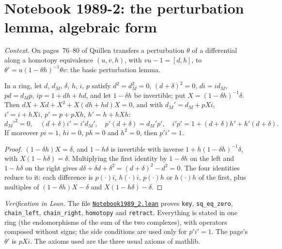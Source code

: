 \section[Notebook 1989-2: the perturbation lemma]{Notebook 1989-2: the perturbation lemma, algebraic form\protect{}}\label{sec:quillen-1989-2}

\emph{Context.} On pages~76--80 of  Quillen transfers a perturbation $\theta$ of a differential along a homotopy equivalence $(u, v, h)$, with $vu - 1 = [d, h]$, to $\theta' = u(1 - \theta h)^{-1}\theta v$: the basic perturbation lemma.

\begin{encadre}
\begin{theoreme}\label{thm:quillen-1989-2}
In a ring, let $d$, $d_M$, $\delta$, $h$, $i$, $p$ satisfy $d^2 = d_M^2 = 0$, $(d + \delta)^2 = 0$, $di = id_M$, $pd = d_Mp$, $ip = 1 + dh + hd$, and let $1 - \delta h$ be invertible; put $X = (1 - \delta h)^{-1}\delta$. Then $dX + Xd + X^2 + X(dh + hd)X = 0$, and with $d_M' = d_M + pXi$, $i' = i + hXi$, $p' = p + pXh$, $h' = h + hXh$:
\[ d_M'^2 = 0,\quad (d + \delta)i' = i'd_M',\quad p'(d + \delta) = d_M'p',\quad i'p' = 1 + (d + \delta)h' + h'(d + \delta). \]
If moreover $pi = 1$, $hi = 0$, $ph = 0$ and $h^2 = 0$, then $p'i' = 1$.
\end{theoreme}
\end{encadre}

\begin{proof}
$(1 - \delta h)X = \delta$, and $1 - h\delta$ is invertible with inverse $1 + h(1 - \delta h)^{-1}\delta$, with $X(1 - h\delta) = \delta$. Multiplying the first identity by $1 - \delta h$ on the left and $1 - h\delta$ on the right gives $d\delta + \delta d + \delta^2 = (d + \delta)^2 - d^2 = 0$. The four identities reduce to it: each difference is $p(\cdot)i$, $h(\cdot)i$, $p(\cdot)h$ or $h(\cdot)h$ of the first, plus multiples of $(1 - \delta h)X - \delta$ and $X(1 - h\delta) - \delta$.
\end{proof}

\emph{Verification in Lean.} The file \href{\leanblobmain/Notebook1989_2.lean}{\texttt{Notebook1989\_2.\allowbreak{}lean}} proves \texttt{key}, \texttt{sq\_eq\_zero}, \texttt{chain\_left}, \texttt{chain\_right}, \texttt{homotopy} and \texttt{retract}. Everything is stated in one ring (the endomorphisms of the sum of the two complexes), with operators composed without signs; the side conditions are used only for $p'i' = 1$. The page's $\theta'$ is $pXi$. The axioms used are the three usual axioms of mathlib.


